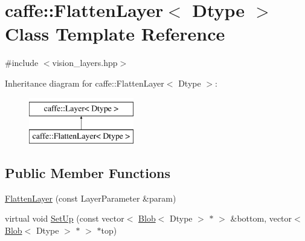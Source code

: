 \hypertarget{classcaffe_1_1_flatten_layer}{\section{caffe\+:\+:Flatten\+Layer$<$ Dtype $>$ Class Template Reference}
\label{classcaffe_1_1_flatten_layer}
}


{\ttfamily \#include $<$vision\+\_\+layers.\+hpp$>$}

Inheritance diagram for caffe\+:\+:Flatten\+Layer$<$ Dtype $>$\+:\begin{figure}[H]
\begin{center}
\leavevmode
\includegraphics[height=2.000000cm]{classcaffe_1_1_flatten_layer}
\end{center}
\end{figure}
\subsection*{Public Member Functions}
\begin{DoxyCompactItemize}
\item 
\hyperlink{classcaffe_1_1_flatten_layer_a7ab62567c2fb5424979dc16af273b688}{Flatten\+Layer} (const Layer\+Parameter \&param)
\item 
virtual void \hyperlink{classcaffe_1_1_flatten_layer_a49568781c51bfd9e762007910127254e}{Set\+Up} (const vector$<$ \hyperlink{classcaffe_1_1_blob}{Blob}$<$ Dtype $>$ $\ast$ $>$ \&bottom, vector$<$ \hyperlink{classcaffe_1_1_blob}{Blob}$<$ Dtype $>$ $\ast$ $>$ $\ast$top)
\end{DoxyCompactItemize}
